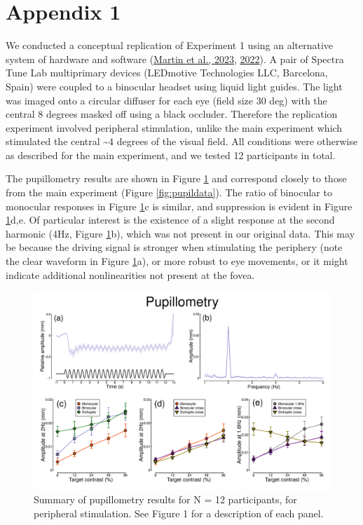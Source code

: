 \documentclass[
]{article}
\newcommand{\beginsupplement}{\setcounter{table}{0}
\renewcommand{\thetable}{A\arabic{table}}
\setcounter{figure}{0}
\renewcommand{\thefigure}{A\arabic{figure}}}
\begin{document}
\hypertarget{appendix-1}{%
\section{Appendix 1}\label{appendix-1}}

\beginsupplement

We conducted a conceptual replication of Experiment 1 using an alternative system of hardware and software (\protect\hyperlink{ref-Martin2023}{Martin et al., 2023}, \protect\hyperlink{ref-Martin2022}{2022}). A pair of Spectra Tune Lab multiprimary devices (LEDmotive Technologies LLC, Barcelona, Spain) were coupled to a binocular headset using liquid light guides. The light was imaged onto a circular diffuser for each eye (field size 30 deg) with the central 8 degrees masked off using a black occluder. Therefore the replication experiment involved peripheral stimulation, unlike the main experiment which stimulated the central \textasciitilde4 degrees of the visual field. All conditions were otherwise as described for the main experiment, and we tested 12 participants in total.

The pupillometry results are shown in Figure \ref{fig:appendixfig1} and correspond closely to those from the main experiment (Figure \ref{fig:pupildata}). The ratio of binocular to monocular responses in Figure \ref{fig:appendixfig1}c is similar, and suppression is evident in Figure \ref{fig:appendixfig1}d,e. Of particular interest is the existence of a slight response at the second harmonic (4Hz, Figure \ref{fig:appendixfig1}b), which was not present in our original data. This may be because the driving signal is stronger when stimulating the periphery (note the clear waveform in Figure \ref{fig:appendixfig1}a), or more robust to eye movements, or it might indicate additional nonlinearities not present at the fovea.

\begin{figure}

{\centering \includegraphics{Figures/pupildataRep} 

}

\caption{Summary of pupillometry results for N = 12 participants, for peripheral stimulation. See Figure 1 for a description of each panel.}\label{fig:appendixfig1}
\end{figure}
\end{document}
